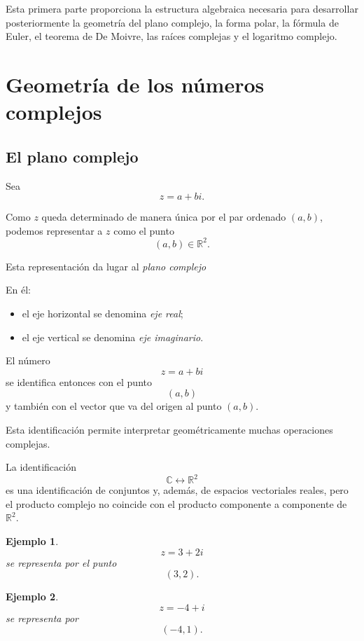 \documentclass[12pt]{article}
\newtheorem{Ejem}{Ejemplo}
\begin{document}
Esta primera parte proporciona la estructura algebraica necesaria para
desarrollar posteriormente la geometría del plano complejo, la forma polar,
la fórmula de Euler, el teorema de De Moivre, las raíces complejas y el
logaritmo complejo.

\section{Geometría de los números complejos}

\subsection*{El plano complejo}

Sea
\[
z=a+bi.
\]

Como $z$ queda determinado de manera única por el par ordenado $(a,b)$, podemos representar a $z$ como el punto
\[
(a,b)\in\mathbb{R}^2.
\]

Esta representación da lugar al \emph{plano complejo} 

En él:
\begin{itemize}
    \item el eje horizontal se denomina \emph{eje real};
    \item el eje vertical se denomina \emph{eje imaginario}.
\end{itemize}

El número
\[
z=a+bi
\]
se identifica entonces con el punto
\[
(a,b)
\]
y también con el vector que va del origen al punto $(a,b)$.

Esta identificación permite interpretar geométricamente muchas operaciones
complejas.

La identificación
\[
\mathbb{C}\leftrightarrow\mathbb{R}^2
\]
es una identificación de conjuntos y, además, de espacios vectoriales reales, pero el producto complejo no coincide con el producto componente a componente de $\mathbb{R}^2$.


\begin{Ejem} \[
z=3+2i
\]
se representa por el punto
\[
(3,2).
\]

\end{Ejem}

\begin{Ejem} \[
z=-4+i
\]
se representa por
\[
(-4,1).
\]

\end{Ejem}
\end{document}
